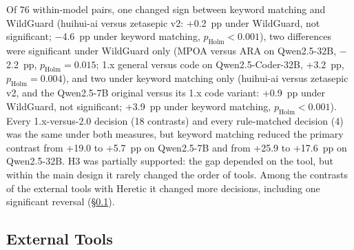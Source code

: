 Of 76 within-model pairs, one changed sign between keyword matching and WildGuard (huihui-ai versus zetasepic v2:
+0.2~pp under WildGuard, not significant; $-$4.6~pp under keyword matching, $p_\mathrm{Holm}<0.001$), two differences
were significant under WildGuard only (MPOA versus ARA on Qwen2.5-32B, $-$2.2~pp, $p_\mathrm{Holm}=0.015$; 1.x
general versus code on Qwen2.5-Coder-32B, +3.2~pp, $p_\mathrm{Holm}=0.004$), and two under keyword matching only
(huihui-ai versus zetasepic v2, and the Qwen2.5-7B original versus its 1.x code variant: +0.9~pp under WildGuard,
not significant; +3.9~pp under keyword matching, $p_\mathrm{Holm}<0.001$). Every 1.x-versus-2.0 decision (18
contrasts) and every rule-matched decision (4) was the same under both measures, but keyword matching reduced the
primary contrast from +19.0 to +5.7~pp on Qwen2.5-7B and from +25.9 to +17.6~pp on Qwen2.5-32B. H3 was partially
supported: the gap depended on the tool, but within the main design it rarely changed the order of tools. Among the
contrasts of the external tools with Heretic it changed more decisions, including one significant reversal
(\S\ref{sec:res-external}).

\subsection{External Tools}
\label{sec:res-external}

\begin{table}[tbp]
\centering\small
\caption{External tools at their documented default or recommended settings (one run each, seed~1, no search or
selection by the author), with Heretic context rows from the same base model (held-out harmful prompts, WildGuard;
Wilson 95\% CI). Capability $\Delta$: change of the mean of the five benchmarks (paired 95\% CI). TF div.:
teacher-forced divergence from the original on the 350 benign prompts. The tools' own checks use their own prompts,
markers and generation lengths and are not comparable with the held-out measures (\S\ref{sec:external}).}
\label{tab:external}
\setlength{\tabcolsep}{3.5pt}
\resizebox{\textwidth}{!}{}
\end{table}

